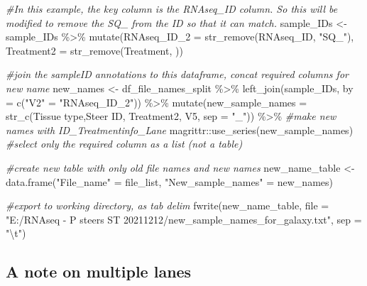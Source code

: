 \documentclass[
]{book}
\newenvironment{Shaded}{\begin{snugshade}}{\end{snugshade}}
\newcommand{\AttributeTok}[1]{\textcolor[rgb]{0.77,0.63,0.00}{#1}}
\newcommand{\CommentTok}[1]{\textcolor[rgb]{0.56,0.35,0.01}{\textit{#1}}}
\newcommand{\FunctionTok}[1]{\textcolor[rgb]{0.00,0.00,0.00}{#1}}
\newcommand{\NormalTok}[1]{#1}
\newcommand{\OtherTok}[1]{\textcolor[rgb]{0.56,0.35,0.01}{#1}}
\newcommand{\SpecialCharTok}[1]{\textcolor[rgb]{0.00,0.00,0.00}{#1}}
\newcommand{\StringTok}[1]{\textcolor[rgb]{0.31,0.60,0.02}{#1}}
\begin{document}
\begin{Shaded}
\begin{Highlighting}[]
\CommentTok{\#In this example, the \textquotesingle{}key\textquotesingle{} column is the RNAseq\_ID column. So this will be modified to remove the \textquotesingle{}SQ\_\textquotesingle{} from the ID so that it can match.}
\NormalTok{sample\_IDs }\OtherTok{\textless{}{-}} 
\NormalTok{  sample\_IDs }\SpecialCharTok{\%\textgreater{}\%} 
  \FunctionTok{mutate}\NormalTok{(}\AttributeTok{RNAseq\_ID\_2 =} \FunctionTok{str\_remove}\NormalTok{(RNAseq\_ID, }\StringTok{"SQ\_"}\NormalTok{),}
         \AttributeTok{Treatment2 =} \FunctionTok{str\_remove}\NormalTok{(Treatment, }\StringTok{\textquotesingle{}{-}\textquotesingle{}}\NormalTok{))}

\CommentTok{\#join the sampleID annotations to this dataframe, concat required columns for new name}
\NormalTok{new\_names }\OtherTok{\textless{}{-}}\NormalTok{ df\_file\_names\_split }\SpecialCharTok{\%\textgreater{}\%} 
  \FunctionTok{left\_join}\NormalTok{(sample\_IDs, }\AttributeTok{by =} \FunctionTok{c}\NormalTok{(}\StringTok{"V2"} \OtherTok{=} \StringTok{"RNAseq\_ID\_2"}\NormalTok{)) }\SpecialCharTok{\%\textgreater{}\%} 
  \FunctionTok{mutate}\NormalTok{(}\AttributeTok{new\_sample\_names =} \FunctionTok{str\_c}\NormalTok{(}\StringTok{\textasciigrave{}}\AttributeTok{Tissue type}\StringTok{\textasciigrave{}}\NormalTok{,}\StringTok{\textasciigrave{}}\AttributeTok{Steer ID}\StringTok{\textasciigrave{}}\NormalTok{, Treatment2, V5, }\AttributeTok{sep =} \StringTok{"\_"}\NormalTok{)) }\SpecialCharTok{\%\textgreater{}\%} \CommentTok{\#make new names with ID\_Treatmentinfo\_Lane}
\NormalTok{  magrittr}\SpecialCharTok{::}\FunctionTok{use\_series}\NormalTok{(new\_sample\_names) }\CommentTok{\#select only the required column as a list (not a table)}

\CommentTok{\#create new table with only old file names and new names}
\NormalTok{new\_name\_table }\OtherTok{\textless{}{-}}
  \FunctionTok{data.frame}\NormalTok{(}\StringTok{"File\_name"} \OtherTok{=}\NormalTok{ file\_list, }\StringTok{"New\_sample\_names"} \OtherTok{=}\NormalTok{ new\_names)}

\CommentTok{\#export to working directory, as tab delim }
\FunctionTok{fwrite}\NormalTok{(new\_name\_table, }\AttributeTok{file =} \StringTok{"E:/RNAseq {-} P steers ST 20211212/new\_sample\_names\_for\_galaxy.txt"}\NormalTok{, }\AttributeTok{sep =} \StringTok{"}\SpecialCharTok{\textbackslash{}t}\StringTok{"}\NormalTok{)}
\end{Highlighting}
\end{Shaded}

\hypertarget{rename-note}{%
\subsection{A note on multiple lanes}\label{rename-note}}
\end{document}

